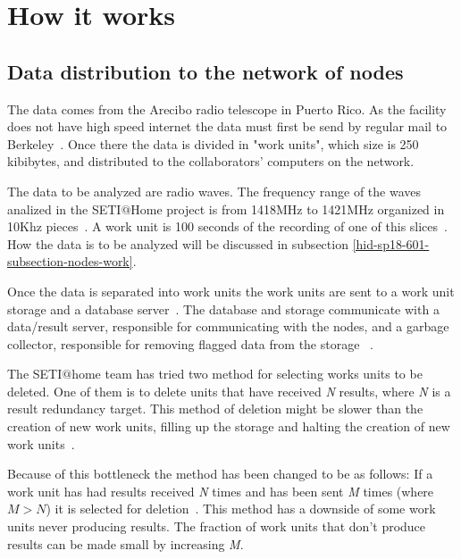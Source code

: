 \section{How it works}
\label{hid-sp18-601-section-howworks}
\subsection{Data distribution to the network of nodes}
\label{hid-sp18-601-subsection-data-dist}
The data comes from the Arecibo radio telescope in Puerto Rico. As the facility
does not have high speed internet the data must first be send by regular mail to
 Berkeley~\cite{hid-sp18-601-www-sathome-howworks}. Once there the data is 
 divided in "work units", which size is 250 kibibytes, and distributed to the 
 collaborators' computers on the network.

The data to be analyzed are radio waves. The frequency range of the waves 
analized in the SETI$@$Home project is from 1418MHz to 1421MHz organized in 
10Khz pieces~\cite{hid-sp18-601-paper-anderson2002seti}. A work unit is 100 
seconds of the recording of one of this 
slices~\cite{hid-sp18-601-www-sathome-howworks}. How the data is to be analyzed 
will be discussed in subsection \ref{hid-sp18-601-subsection-nodes-work}.

Once the data is separated into work units the work units are sent to a work 
unit storage and a database server~\cite{hid-sp18-601-book-foster1999carl}. 
The database and storage communicate with a data/result server, responsible for 
communicating with the nodes, and a garbage collector, responsible for 
removing flagged data from the 
storage
~\cite{hid-sp18-601-book-foster1999carl,hid-sp18-601-paper-anderson2002seti}.

The SETI$@$home team has tried two method for selecting works units to be 
deleted. One of them is to delete units that have received \textit{N} results,
where \textit{N} is a result redundancy target. This method of deletion might 
be slower than the creation of new work units, filling up the storage and 
halting the creation of new work 
units~\cite{hid-sp18-601-paper-anderson2002seti}.

Because of this bottleneck the method has been changed to be as follows: 
If a work unit has had results received \textit{N} times and has been sent 
\textit{M} times (where $M>N$) it is selected for 
deletion~\cite{hid-sp18-601-paper-anderson2002seti}. This method has 
a downside of some work units never producing results. The fraction of work
units that don't produce results can be made small by increasing \textit{M}.

